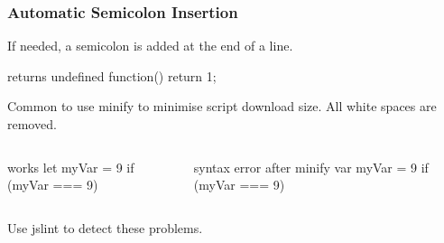 \documentclass[aspectratio=1610]{beamer}
\begin{document}












\begin{frame}[fragile]
  \frametitle{Automatic Semicolon Insertion}
  If needed, a semicolon is added at the end of a line.
\begin{CodeBox}{returns undefined}
  function() { return
  1; }
\end{CodeBox}

\vspace{4mm}
Common to use minify to minimise script download size. All white spaces are removed.
\begin{columns}[onlytextwidth]
  \begin{column}{0.35\textwidth}
\begin{CodeBox}{works}
  let myVar = 9
  if (myVar === 9) {
  }
\end{CodeBox}
  \end{column}
  \begin{column}{0.65\textwidth}
\begin{CodeBox}{syntax error after minify}
  var myVar = 9 if (myVar === 9) {}
\end{CodeBox}
  \end{column}
  \begin{column}{0.3\textwidth}  \end{column}
\end{columns}%

\vspace{4mm}
Use jslint to detect these problems.
\end{frame}
\end{document}
